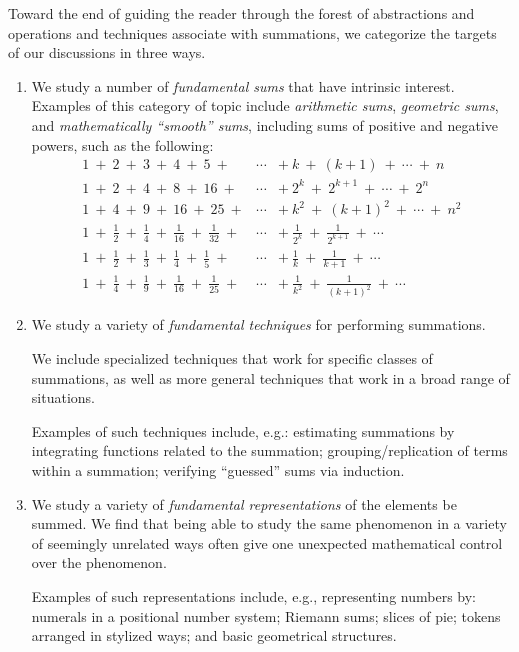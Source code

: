 Toward the end of guiding the reader through the forest of
abstractions and operations and techniques associate with summations,
we categorize the targets of our discussions in three ways.
\begin{enumerate}
\item
We study a number of {\it fundamental sums} that have intrinsic
interest.
Examples of this category of topic include {\it arithmetic sums}, {\it
  geometric sums}, and {\it mathematically ``smooth'' sums}, including
sums of positive and negative powers, such as the following:
\[
\begin{array}{lcl}
1 \ + \ 2 \ + \ 3 \ + \ 4 \ + \ 5 \ + & \cdots & + \ k  \ + \ (k+1) \ +
\ \cdots \ + \ n \\
1 \ + \ 2 \ + \ 4 \ + \ 8 \ + \ 16 \ + & \cdots & + \ 2^k  \ +
\ 2^{k+1} \ + \ \cdots \ + \ 2^n \\
1 \ + \ 4 \ + \ 9 \ + \ 16 \ + \ 25 \ + & \cdots & + \ k^2  \ + \ (k+1)^2 \ +
\ \cdots \ + \ n^2 \\
1 \ + \ \frac{1}{2} \ + \ \frac{1}{4} \ + \ \frac{1}{16} \ +
\ \frac{1}{32} \ + & \cdots & + \ \frac{1}{2^k}  \ + \ \frac{1}{2^{k+1}} \ +
\ \cdots \\
1 \ + \ \frac{1}{2} \ + \ \frac{1}{3} \ + \ \frac{1}{4} \ +
\ \frac{1}{5} \ + & \cdots & + \ \frac{1}{k}  \ + \ \frac{1}{k+1} \ +
\ \cdots \\
1 \ + \ \frac{1}{4} \ + \ \frac{1}{9} \ + \ \frac{1}{16} \ +
\ \frac{1}{25} \ + & \cdots & + \ \frac{1}{k^2}  \ + \ \frac{1}{(k+1)^2} \ +
\ \cdots
\end{array}
\]

\item
We study a variety of {\it fundamental techniques} for performing
summations.

We include specialized techniques that work for specific classes of
summations, as well as more general techniques that work in a broad
range of situations.

Examples of such techniques include, e.g.: estimating summations by
integrating functions related to the summation; grouping/replication
of terms within a summation; verifying ``guessed'' sums via induction.

\item
We study a variety of {\it fundamental representations} of the
elements be summed.  We find that being able to study the same
phenomenon in a variety of seemingly unrelated ways often give one
unexpected mathematical control over the phenomenon.

Examples of such representations include, e.g., representing numbers
by: numerals in a positional number system; Riemann sums; slices of
pie; tokens arranged in stylized ways; and basic geometrical
structures.
\end{enumerate}

